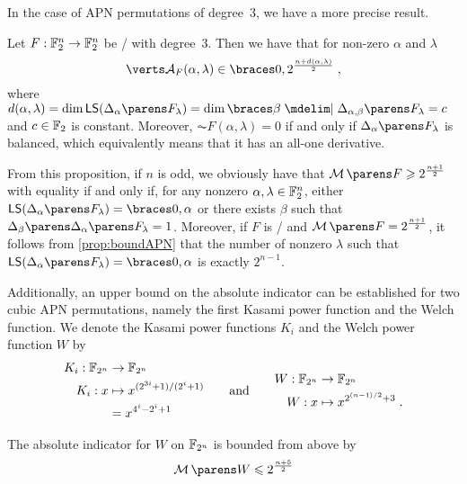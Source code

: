 In the case of APN permutations of degree~$3$, we have a more precise result.

\begin{proposition} \label{prop:cubic}
Let $F: \mathbb{F}_2^n \rightarrow \mathbb{F}_2^n$ be \APN/ with degree~$3$.
Then we have that for non-zero $\alpha$ and $\lambda$
\begin{equation*}
    \abs{\AC{F}(\alpha,\lambda)} \in \set{0, 2^{\frac{n+d(\alpha,\lambda)}{2}}}\;,
\end{equation*}
where $d(\alpha,\lambda) = \dim \LS(\derive{\alpha}{F_\lambda}) = \dim \set{\beta \given \derive{\alpha,\beta}{F_\lambda} = c}$ and $c \in \mathbb{F}_2$ is constant.
Moreover, $\AC{F}(\alpha,\lambda) = 0$ if and only if $\derive{\alpha}{F_\lambda}$ is balanced, which equivalently means that it has an all-one derivative.
\end{proposition}

From this proposition, if $n$ is odd, we obviously have that $\absoluteindicator{F} \geqslant 2^{\frac{n+1}{2}}$ with equality if and only if, for any nonzero $\alpha,\lambda \in \mathbb{F}_2^n$, either $\LS(\derive{\alpha}{F_\lambda})=\set{0,\alpha}$ or there exists $\beta$ such that $\derive{\beta}{\derive{\alpha}{F_\lambda}} = 1$.
Moreover, if $F$ is \APN/ and $\absoluteindicator{F} = 2^{\frac{n+1}{2}}$, it follows from \cref{prop:boundAPN} that the number of nonzero $\lambda$ such that $\LS(\derive{\alpha}{F_\lambda}) = \set{0,\alpha}$ is exactly $2^{n-1}$.

Additionally, an upper bound on the absolute indicator can be established for two cubic APN permutations, namely the first Kasami power function and the Welch function.
We denote the Kasami power functions $K_i$ and the Welch power function $W$ by
\begin{equation*}
    \begin{aligned}
        K_i : \mathbb{F}_{2^n} &\to \mathbb{F}_{2^n} \\
        K_i : x &\mapsto x^{(2^{3i}+1)/(2^i+1)} \\ &= x^{4^i-2^i+1}
    \end{aligned}
    \qquad \text{and} \qquad
    \begin{aligned}
        W : \mathbb{F}_{2^n} &\to \mathbb{F}_{2^n} \\
        W : x &\mapsto x^{2^{(n-1)/2}+3}\;.
    \end{aligned}
\end{equation*}

\begin{proposition}
    The absolute indicator for $W$ on $\mathbb{F}_{2^n}$ is bounded from above by
    \begin{equation*}
        \absoluteindicator{W} \leqslant 2^{\frac{n+5}{2}}
    \end{equation*}
\end{proposition}

